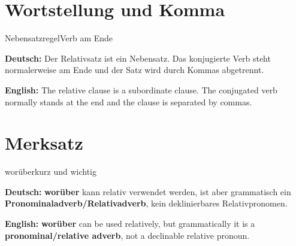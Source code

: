 \documentclass[a4paper,11pt]{article}
\newcommand{\GermanText}[1]{\textbf{Deutsch: }#1\par}
\newcommand{\EnglishText}[1]{{\small\color{SoftGray}\textbf{English: }#1\par}}
\begin{document}
\section{Wortstellung und Komma}

\begin{grammarentry}{Nebensatzregel}{Verb am Ende}

\GermanText{Der Relativsatz ist ein Nebensatz. Das konjugierte Verb steht normalerweise am Ende und der Satz wird durch Kommas abgetrennt.}

\EnglishText{The relative clause is a subordinate clause. The conjugated verb normally stands at the end and the clause is separated by commas.}

\end{grammarentry}

\section{Merksatz}

\begin{grammarentry}{worüber}{kurz und wichtig}

\GermanText{\textbf{worüber} kann relativ verwendet werden, ist aber grammatisch ein \textbf{Pronominaladverb/Relativadverb}, kein deklinierbares Relativpronomen.}

\EnglishText{\textbf{worüber} can be used relatively, but grammatically it is a \textbf{pronominal/relative adverb}, not a declinable relative pronoun.}

\end{grammarentry}
\end{document}
